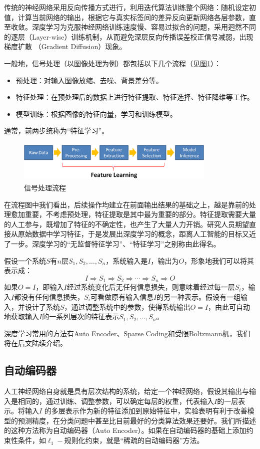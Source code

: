 传统的神经网络采用反向传播方式进行，利用迭代算法训练整个网络：随机设定初值，计算当前网络的输出，根据它与真实标签间的差异反向更新网络各层参数，直至收敛。深度学习为克服神经网络训练速度慢、容易过拟合的问题，采用迥然不同的逐层（Layer-wise）训练机制，从而避免深层反向传播误差校正信号减弱，出现梯度扩散
（Gradient Diffusion）现象。

一般地，信号处理（以图像处理为例）都包括以下几个流程（见图\ref{fig:featurelearning}）：
\begin{itemize}
    \item 预处理：对输入图像放缩、去噪、背景差分等。
    \item 特征处理：在预处理后的数据上进行特征提取、特征选择、特征降维等工作。
    \item 模型训练：根据图像的特征向量，学习和训练模型。
\end{itemize}
通常，前两步统称为“特征学习”。
\begin{figure}[htbp]
  \centering
  \includegraphics[width=0.85\textwidth,height=2cm]{figures/featurelearning.eps}
  \caption{信号处理流程}\label{fig:featurelearning}
\end{figure}
在流程图中我们看出，后续操作均建立在前面输出结果的基础之上，越是靠前的处理愈加重要，不考虑预处理，特征提取是其中最为重要的部分。特征提取需要大量的人工参与，既增加了特征的不确定性，也产生了大量人力开销。研究人员期望直接从原始数据中学习特征，于是发展出深度学习的概念，距离人工智能的目标又近了一步。深度学习的“无监督特征学习”、“特征学习”之别称由此得名。

假设一个系统$S$有$n$层$S_1,S_2,\ldots,S_n$，系统输入是$I$，输出为$O$，形象地我们可以将其表示成：
\begin{equation}
    I \Rightarrow S_1 \Rightarrow S_2\Rightarrow \cdots \Rightarrow S_n \Rightarrow O
\end{equation}
如果$O=I$，即输入$I$经过系统变化后无任何信息损失，则意味着经过每一层$S_i$，输入$I$都没有任何信息损失，$S_i$可看做原有输入信息$I$的另一种表示。假设有一组输入，并设计了系统$S$，通过调整系统中的参数，使得系统输出$O=I$，由此可自动地获取输入$I$的一系列层次的特征表示$S_1,S_2,\ldots,S_n$。

深度学习常用的方法有Auto Encoder、Sparse Coding和受限Boltzmann机，我们将在后文陆续介绍。

\subsection{自动编码器}
人工神经网络自身就是具有层次结构的系统，给定一个神经网络，假设其输出与输入是相同的，通过训练、调整参数，可以确定每层的权重，代表输入$I$的一层表示。将输入$I$ 的多层表示作为新的特征添加到原始特征中，实验表明有利于改善模型的预测精度，在分类问题中甚至比目前最好的分类算法效果还要好。我们所描述的这种方法称为自动编码器（Auto Encoder）。如果在自动编码器的基础上添加约束性条件，如$\ell_1-$规则化约束，就是“稀疏的自动编码器”方法。

